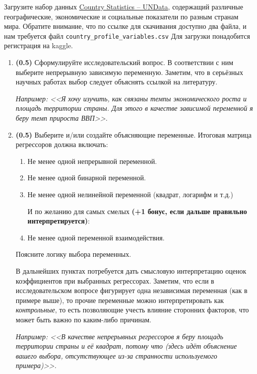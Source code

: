 \documentclass[10pt, a4paper]{extarticle}
\begin{document}
Загрузите набор данных \href{https://www.kaggle.com/sudalairajkumar/undata-country-profiles}{Country Statistics -- UNData}, содержащий различные географические, экономические и социальные показатели по разным странам мира. Обратите внимание, что по ссылке для скачивания доступно два файла, и нам требуется файл {\tt country\_profile\_variables.csv} Для загрузки понадобится регистрация на kaggle. 

\begin{enumerate}
	\item \textbf{(0.5)} Сформулируйте исследовательский вопрос. В соответствии с ним выберите непрерывную зависимую переменную. Заметим, что в серьёзных научных работах выбор следует объяснять ссылкой на литературу.
	
	\textit{Например: <<Я хочу изучить, как связаны темпы экономического роста и площадь территории страны. Для этого в качестве зависимой переменной я беру темп прироста ВВП>>.}
	\item \textbf{(0.5)} Выберите и/или создайте объясняющие переменные. Итоговая матрица регрессоров должна включать:
	\begin{enumerate}
		\item Не менее одной непрерывной переменной.
		\item Не менее одной бинарной переменной.
		\item Не менее одной нелинейной переменной (квадрат, логарифм и т.д.)
		
		\vspace{1em}
		\hspace{-2em}И по желанию для самых смелых \textbf{(+1 бонус, если дальше правильно интерпретируется)}:
		
		\vspace{0.5em}
		\item Не менее одной переменной взаимодействия.
	\end{enumerate}
	Поясните логику выбора переменных.
	
	В дальнейших пунктах потребуется дать смысловую интерпретацию оценок коэффициентов при выбранных регрессорах. Заметим, что если в исследовательском вопросе фигурирует одна независимая переменная (как в примере выше), то прочие переменные можно интерпретировать как \textit{контрольные}, то есть позволяющие учесть влияние сторонних факторов, что может быть важно по каким-либо причинам. 
	
	\textit{Например: <<В качестве непрерывных регрессоров я беру площадь территории страны и её квадрат, потому что (здесь идёт объяснение вашего выбора, отсутствующее из-за странности используемого примера)>>.}
	

\end{enumerate}
\end{document}
